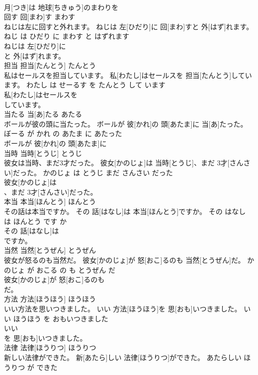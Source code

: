 \documentclass[8pt]{extreport}
\begin{document}
\begin{CJK}{UTF8}{min}
\\	月[つき]は 地球[ちきゅう]のまわりを
\\	回す	回[まわ]す	まわす	
\\	ねじは左に回すと外れます。	ねじは 左[ひだり]に 回[まわ]すと 外[はず]れます。	ねじ は ひだり に まわす と はずれます	
\\	ねじは 左[ひだり]に
\\	と 外[はず]れます。			
\\	担当	担当[たんとう]	たんとう	
\\	私はセールスを担当しています。	私[わたし]はセールスを 担当[たんとう]しています。	わたし は せーるす を たんとう して います	
\\	私[わたし]はセールスを
\\	しています。			
\\	当たる	当[あ]たる	あたる	
\\	ボールが彼の頭に当たった。	ボールが 彼[かれ]の 頭[あたま]に 当[あ]たった。	ぼーる が かれ の あたま に あたった	
\\	ボールが 彼[かれ]の 頭[あたま]に
\\	当時	当時[とうじ]	とうじ	
\\	彼女は当時、まだ3才だった。	彼女[かのじょ]は 当時[とうじ]、まだ 3才[さんさい]だった。	かのじょ は とうじ まだ さんさい だった	
\\	彼女[かのじょ]は
\\	、まだ 3才[さんさい]だった。			
\\	本当	本当[ほんとう]	ほんとう	
\\	その話は本当ですか。	その 話[はなし]は 本当[ほんとう]ですか。	その はなし は ほんとう です か	
\\	その 話[はなし]は
\\	ですか。			
\\	当然	当然[とうぜん]	とうぜん	
\\	彼女が怒るのも当然だ。	彼女[かのじょ]が 怒[おこ]るのも 当然[とうぜん]だ。	かのじょ が おこる の も とうぜん だ	
\\	彼女[かのじょ]が 怒[おこ]るのも
\\	だ。			
\\	方法	方法[ほうほう]	ほうほう	
\\	いい方法を思いつきました。	いい 方法[ほうほう]を 思[おも]いつきました。	いい ほうほう を おもいつきました	
\\	いい
\\	を 思[おも]いつきました。			
\\	法律	法律[ほうりつ]	ほうりつ	
\\	新しい法律ができた。	新[あたら]しい 法律[ほうりつ]ができた。	あたらしい ほうりつ が できた	

\end{CJK}
\end{document}
